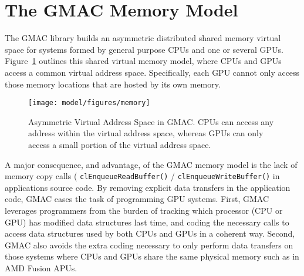 \section{The GMAC Memory Model}

The GMAC library builds an asymmetric distributed shared memory virtual space for systems formed by 
general purpose CPUs and one or several GPUs. Figure~\ref{fig:overview:memory} outlines this shared 
virtual memory model, where CPUs and GPUs access a common virtual address space. Specifically, each 
GPU cannot only access those memory locations that are hosted by its own memory.

\begin{figure}
\centering
\texttt{[image: model/figures/memory]}
\caption{Asymmetric Virtual Address Space in GMAC\@. CPUs can access any address within the virtual 
address space, whereas GPUs can only access a small portion of the virtual address space.}
\label{fig:overview:memory}
\end{figure}

A major consequence, and advantage, of the GMAC memory model is the lack of memory copy calls (\eg 
\texttt{clEnqueueReadBuffer()} / \texttt{clEnqueueWriteBuffer()} in applications source code. By 
removing explicit data transfers in the application code, GMAC eases the task of programming GPU 
systems. First, GMAC leverages programmers from the burden of tracking which processor (\ie CPU or 
GPU) has modified data structures last time, and coding the necessary calls to access data 
structures used by both CPUs and GPUs in a coherent way. Second, GMAC also avoids the extra coding 
necessary to only perform data transfers on those systems where CPUs and GPUs share the same 
physical memory such as in AMD Fusion APUs.



